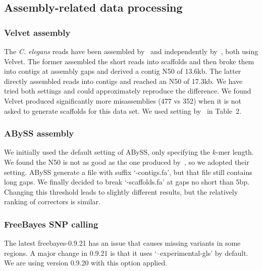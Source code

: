 \documentclass{bioinfo2}
\makeatletter
\newcommand{\specialcell}[2][c]{%
  \begin{tabular}[#1]{@{}l@{}}#2\end{tabular}}
\makeatother
\begin{document}

\subsection{Assembly-related data processing}

\subsubsection{Velvet assembly}
The {\it C. elegans} reads have been assembled by~\citet{Simpson:2012aa} and
independently by~\citet{Song:2014aa}, both using Velvet. The former assembled
the short reads into scaffolds and then broke them into contigs at assembly
gaps and derived a contig N50 of 13.6kb. The latter directly assembled reads into
contigs and reached an N50 of 17.3kb. We have tried both settings and could
approximately reproduce the difference.  We found Velvet produced significantly
more misassemblies (477 vs 352) when it is not asked to generate scaffolds for
this data set. We used setting by~\citet{Simpson:2012aa} in Table~2.

\subsubsection{ABySS assembly}
We initially used the default setting of ABySS, only specifying the $k$-mer length.
We found the N50 is not as good as the one produced by~\citet{Simpson:2012aa},
so we adopted their setting. ABySS generate a file with suffix
`\mbox{-contigs.fa}', but that file still contains long gaps. We finally
decided to break `-scaffolds.fa' at gaps no short than 5bp. Changing this
threshold leads to slightly different results, but the relatively ranking of
correctors is similar.

\subsubsection{FreeBayes SNP calling}
The latest freebayes-0.9.21 has an issue that causes missing variants in some
regions. A major change in 0.9.21 is that it uses `--experimental-gls' by
default. We are using version 0.9.20 with this option applied.
\end{document}
